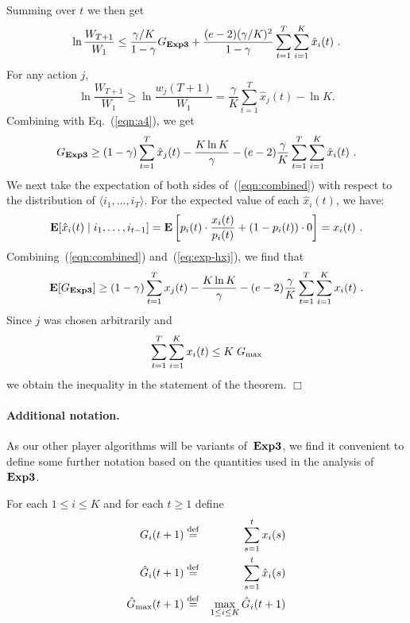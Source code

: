 \documentclass[12pt]{article}
\renewcommand{\ss}{\tilde{s}}
\newcommand{\E}{\mbox{\rm\bf E}}
\newcommand{\Aest}{{\bf Exp3}}
\newcommand{\brackets}[1]{\left[{#1}\right]}
\newcommand{\defeq}{\stackrel{\rm def}{=}}
\newcommand{\x}[2]{x_{#1}({#2})}
\newcommand{\w}[2]{w_{#1}({#2})}
\renewcommand{\i}[1]{i_{#1}}
\newcommand{\Gh}[1]{\hat{G}_{#1}}
\newcommand{\Ghbest}{\hat{G}_{\rm max}}
\newcommand{\Gbest}{G_{\rm max}}
\newcommand{\p}[2]{p_{#1}(#2)}
\newcommand{\hx}[2]{\hat{x}_{#1}(#2)}
\begin{document}
Summing over $t$ we then get
\begin{equation} \label{eqn:a4}
        \ln\frac{W_{T+1}}{W_1} \leq \frac{\gamma/K}{1-\gamma} G_{\Aest}
        + \frac{(e-2)(\gamma/K)^2}{1-\gamma}
        \sum_{t=1}^T\sum_{i=1}^K \hx{i}{t}~.
\end{equation}
For any action $j$,
\[
        \ln\frac{W_{T+1}}{W_1} \geq \ln\frac{\w{j}{T+1}}{W_1}
        = \frac{\gamma}{K}\sum_{t=1}^T \hx{j}{t} - \ln K.
\]
Combining with Eq.~(\ref{eqn:a4}),
we get
\begin{equation}
\label{eqn:combined}
    G_{\Aest}
\geq
    (1-\gamma)\sum_{t=1}^T \hx{j}{t} - \frac{K\ln K}{\gamma}
    - (e-2)\frac{\gamma}{K}\sum_{t=1}^T\sum_{i=1}^K \hx{i}{t}~.
\end{equation}
We next take the expectation of both sides of~(\ref{eqn:combined}) with respect
to the distribution of $\langle i_1,\ldots,i_T\rangle$.
For the expected value of each $\hx{i}{t}$, we have:
\begin{equation}
\label{eq:exp-hxj}
        \E[\hx{i}{t} \mid \i{1},\ldots,\i{t-1}]
 = 
        \E\brackets{\p{i}{t} \cdot \frac{\x{i}{t}}{\p{i}{t}}
        + (1-\p{i}{t})\cdot 0}
=
        \x{i}{t}~.
\end{equation}
Combining~(\ref{eqn:combined}) and~(\ref{eq:exp-hxj}), we find that
\[
    \E[G_{\Aest}]
\geq
    (1 - \gamma)\sum_{t=1}^T \x{j}{t}
    - \frac{K\ln K}{\gamma}
    - (e-2)\frac{\gamma}{K}\sum_{t=1}^T \sum_{i=1}^K \x{i}{t}~.
\]
Since $j$ was chosen arbitrarily and
\[
        \sum_{t=1}^T \sum_{i=1}^K \x{i}{t} \leq K\;\Gbest
\]
we obtain the inequality in the statement of the theorem.
\hfill $\Box$

\paragraph{Additional notation.}
As our other player algorithms will be variants of~$\Aest$, we find it convenient
to define some further notation based on the quantities used in the analysis
of~$\Aest$.

For each $1 \leq i \leq K$ and for each $t \geq 1$ define
\begin{eqnarray*}
        G_i(t+1) & \defeq & \sum_{s=1}^t \x{i}{s}
\\
        \Gh{i}(t+1) & \defeq & \sum_{s=1}^t \hx{i}{s}
\\
        \Ghbest(t+1) & \defeq & \max_{1 \leq i \leq K} \Gh{i}(t+1)
\end{eqnarray*}


\renewcommand{\ss}[1]{\tilde{s}_{#1}}
\newcommand{\hy}[2]{\hat{y}_{#1}(#2)}
\newcommand{\prob}[1]{{\rm\bf P}\left\{#1\right\}}
\newcommand{\Y}[1]{Y(#1)}
\newcommand{\Q}[1]{Q(#1)}
\end{document}
